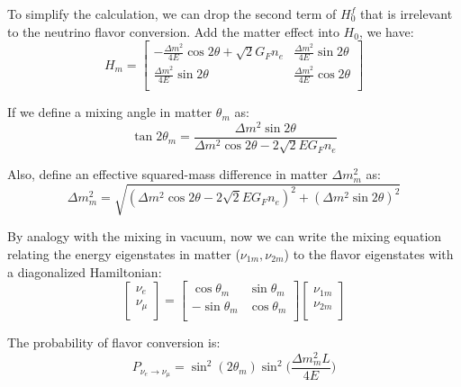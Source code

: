 \documentclass[preprint,12pt]{elsarticle}
\numberwithin{equation}{section}
\begin{document}
To simplify the calculation, we can drop the second term of $H^f_0$ that is irrelevant to the neutrino flavor conversion. Add the matter effect into $H_0$, we have:
\begin{equation}\label{eq:Hm}
H_m = \begin{bmatrix}
-\frac{\Delta m^2}{4E}\cos 2\theta+\sqrt 2G_Fn_e & \frac{\Delta m^2}{4E}\sin 2\theta\\
\frac{\Delta m^2}{4E}\sin 2\theta &\frac{\Delta m^2}{4E}\cos 2\theta\\
\end{bmatrix}
\end{equation}

If we define a mixing angle in matter $\theta_m$ as:
\begin{equation}\label{eq:thetaM}
\tan 2\theta_m = \frac{\Delta m^2\sin2\theta}{\Delta m^2\cos2\theta-2\sqrt 2E G_Fn_e}
\end{equation}

Also, define an effective squared-mass difference in matter $\Delta m^2_m$ as:
\begin{equation}
\Delta m^2_m = \sqrt{(\Delta m^2\cos2\theta - 2\sqrt 2EG_Fn_e)^2+(\Delta m^2\sin2\theta)^2}
\end{equation}

By analogy with the mixing in vacuum, now we can write the mixing equation relating the energy eigenstates in matter ($\nu_{1m},\nu_{2m}$) to the flavor eigenstates with a diagonalized Hamiltonian:
\begin{equation}\label{eq:matter_mixing}
\begin{bmatrix}
\nu_e\\
\nu_\mu\\
\end{bmatrix}
= \begin{bmatrix}
\cos\theta_m & \sin\theta_m\\
-\sin\theta_m & \cos\theta_m \\
\end{bmatrix}
\begin{bmatrix}
\nu_{1m}\\
\nu_{2m}\\
\end{bmatrix}
\end{equation}

The probability of flavor conversion is:
\begin{equation}
P_{\nu_e\to\nu_{\mu}}=\sin^2(2\theta_m)\sin^2\Big(\frac{\Delta m_m^2L}{4E}\Big)
\end{equation}
\end{document}
